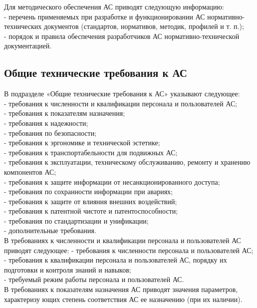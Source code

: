 {Для методического обеспечения АС приводят следующую информацию:\\
- перечень применяемых при разработке и функционировании АС нормативно-технических документов (стандартов, нормативов, методик, профилей и т. п.);\\
- порядок и правила обеспечения разработчиков АС нормативно-технической документацией.\\
\subsection{Общие технические требования к АС}
В подразделе «Общие технические требования к АС» указывают следующее:\\
- требования к численности и квалификации персонала и пользователей АС;\\
- требования к показателям назначения;\\
- требования к надежности;\\
- требования по безопасности;\\
- требования к эргономике и технической эстетике;\\
- требования к транспортабельности для подвижных АС;\\
- требования к эксплуатации, техническому обслуживанию, ремонту и хранению компонентов АС;\\
- требования к защите информации от несанкционированного доступа;\\
- требования по сохранности информации при авариях;\\
- требования к защите от влияния внешних воздействий;\\
- требования к патентной чистоте и патентоспособности;\\
- требования по стандартизации и унификации;\\
- дополнительные требования.\\

В требованиях к численности и квалификации персонала и пользователей АС приводят следующее:
- требования к численности персонала и пользователей АС;\\
- требования к квалификации персонала и пользователей АС, порядку их подготовки и контроля знаний и навыков;\\
- требуемый режим работы персонала и пользователей АС.\\

В требованиях к показателям назначения АС приводят значения параметров, характеризу
ющих степень соответствия АС ее назначению (при их наличии).

}
